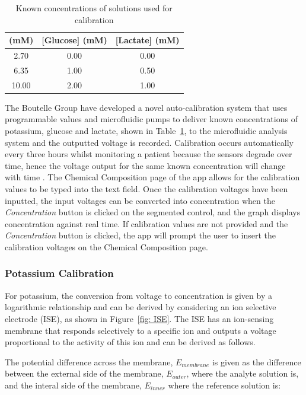 \begin{table}[h!]
\centering
\begin{tabular}{||c c c||} 
 \hline
 [K+] (mM) & [Glucose] (mM) & [Lactate] (mM) \\ [0.5ex] 
 \hline\hline
 2.70 & 0.00 & 0.00 \\
 6.35 & 1.00 & 0.50 \\
 10.00 & 2.00 & 1.00 \\
 \hline
\end{tabular}
\caption{Known concentrations of solutions used for calibration}
\label{table: calibration conc}
\end{table}

The Boutelle Group have developed a novel auto-calibration system that uses programmable values and microfluidic pumps to deliver known concentrations of potassium, glucose and lactate, shown in Table~\ref{table: calibration conc}, to the microfluidic analysis system and the outputted voltage is recorded. Calibration occurs automatically every three hours whilst monitoring a patient because the sensors degrade over time, hence the voltage output for the same known concentration will change with time \cite{Rogers2017}. The Chemical Composition page of the app allows for the calibration values to be typed into the text field. Once the calibration voltages have been inputted, the input voltages can be converted into concentration when the \textit{Concentration} button is clicked on the segmented control, and the graph displays concentration against real time. If calibration values are not provided and the \textit{Concentration} button is clicked, the app will prompt the user to insert the calibration voltages on the Chemical Composition page. 

\subsubsection{Potassium Calibration}

For potassium, the conversion from voltage to concentration is given by a logarithmic relationship and can be derived by considering an ion selective electrode (ISE), as shown in Figure~\ref{fig: ISE}. The ISE has an ion-sensing membrane that responds selectively to a specific ion and outputs a voltage proportional to the activity of this ion \cite{Rogers2017, LibreTexts2019} and can be derived as follows. 

The potential difference across the membrane, $E_{membrane}$ is given as the difference between the external side of the membrane, $E_{outer}$, where the analyte solution is, and the interal side of the membrane, $E_{inner}$ where the reference solution is:

